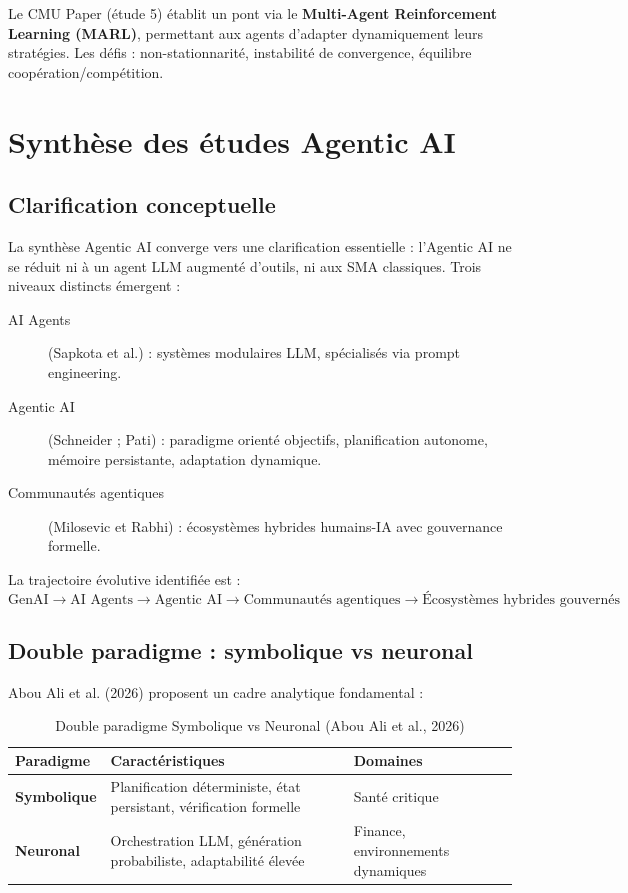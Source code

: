 \documentclass[12pt,a4paper]{report}
\begin{document}
Le CMU Paper (étude 5) établit un pont via le \textbf{Multi-Agent Reinforcement
Learning (MARL)}, permettant aux agents d'adapter dynamiquement leurs stratégies.
Les défis : non-stationnarité, instabilité de convergence, équilibre
coopération/compétition.

\section{Synthèse des études Agentic AI}

\subsection{Clarification conceptuelle}

La synthèse Agentic AI converge vers une clarification essentielle : l'Agentic AI
ne se réduit ni à un agent LLM augmenté d'outils, ni aux SMA classiques. Trois
niveaux distincts émergent :

\begin{description}
  \item[AI Agents] (Sapkota et al.) : systèmes modulaires LLM, spécialisés via
        prompt engineering.
  \item[Agentic AI] (Schneider ; Pati) : paradigme orienté objectifs, planification
        autonome, mémoire persistante, adaptation dynamique.
  \item[Communautés agentiques] (Milosevic et Rabhi) : écosystèmes hybrides
        humains-IA avec gouvernance formelle.
\end{description}

La trajectoire évolutive identifiée est :
\[
\text{GenAI} \to \text{AI Agents} \to \text{Agentic AI} \to
\text{Communautés agentiques} \to \text{Écosystèmes hybrides gouvernés}
\]

\subsection{Double paradigme : symbolique vs neuronal}

Abou Ali et al. (2026) proposent un cadre analytique fondamental :

\begin{table}[H]
\centering
\caption{Double paradigme Symbolique vs Neuronal (Abou Ali et al., 2026)}
\label{tab:paradigmes}
\begin{tabularx}{\textwidth}{L{3cm}L{5.5cm}L{5cm}}
\toprule
\textbf{Paradigme} & \textbf{Caractéristiques} & \textbf{Domaines} \\
\midrule
\textbf{Symbolique} & Planification déterministe, état persistant, vérification formelle & Santé critique \\
\textbf{Neuronal} & Orchestration LLM, génération probabiliste, adaptabilité élevée & Finance, environnements dynamiques \\
\bottomrule
\end{tabularx}
\end{table}
\end{document}
